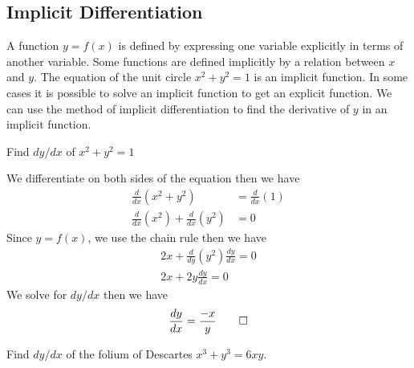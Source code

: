 \subsection{Implicit Differentiation}
A function \(y=f(x)\) is defined by expressing one variable explicitly in
terms of another variable.
Some functions are defined implicitly by a relation between \(x\) and \(y\).
The equation of the unit circle \(x^2+y^2=1\) is an implicit function.
In some cases it is possible to solve an implicit function to get an explicit function.
We can use the method of implicit differentiation to find the derivative of \(y\)
in an implicit function.
\begin{problem}
    Find \(dy/dx\) of \(x^2+y^2=1\)
\end{problem}
\begin{solution}
    We differentiate on both sides of the equation then we have
    \begin{align*}
        \frac{d}{dx}(x^2+y^2)&=\frac{d}{dx}(1) \\
        \frac{d}{dx}(x^2)+\frac{d}{dx}(y^2)&=0
    \end{align*}
    Since \(y=f(x)\), we use the chain rule then we have
    \begin{align*}
        2x+\frac{d}{dy}(y^2)\frac{dy}{dx}=0 \\
        2x+2y\frac{dy}{dx}=0
    \end{align*}
    We solve for \(dy/dx\) then we have
    \[\frac{dy}{dx}=\frac{-x}{y}\qedhere\]
\end{solution}
\begin{problem}
    Find \(dy/dx\) of the folium of Descartes \(x^3+y^3=6xy\).
\end{problem}